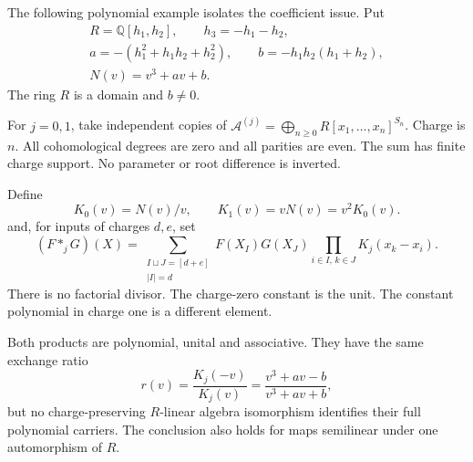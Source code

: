 The following polynomial example isolates the coefficient issue.
Put
\[
 \begin{gathered}
 R=\mathbb Q[h_1,h_2],\qquad h_3=-h_1-h_2,\\
 a=-(h_1^2+h_1h_2+h_2^2),\qquad b=-h_1h_2(h_1+h_2),\\
 N(v)=v^3+av+b.
 \end{gathered}
\]
The ring $R$ is a domain and $b\ne0$.

For $j=0,1$, take independent copies of
$\mathcal A^{(j)}=\bigoplus_{n\geq0}R[x_1,\ldots,x_n]^{S_n}$.
Charge is $n$. All cohomological degrees are zero and all parities are
even. The sum has finite charge support. No parameter or root
difference is inverted.

Define
\[
 K_0(v)=N(v)/v,\qquad K_1(v)=vN(v)=v^2K_0(v).
\]
and, for inputs of charges $d,e$, set
\begin{equation}\label{mht:eq:compact-shuffle}
 (F*_jG)(X)=
 \sum_{\substack{I\sqcup J=[d+e]\\|I|=d}}
 F(X_I)G(X_J)\prod_{i\in I,\,k\in J}K_j(x_k-x_i).
\end{equation}
There is no factorial divisor. The charge-zero constant is the unit.
The constant polynomial in charge one is a different element.

\begin{proposition}\label{mht:prop:compact-shuffle-lattices}
Both products are polynomial, unital and associative. They have the
same exchange ratio
\[
 r(v)=\frac{K_j(-v)}{K_j(v)}
     =\frac{v^3+av-b}{v^3+av+b},
\]
but no charge-preserving $R$-linear algebra isomorphism identifies
their full polynomial carriers. The conclusion also holds for maps
semilinear under one automorphism of $R$.
\end{proposition}

